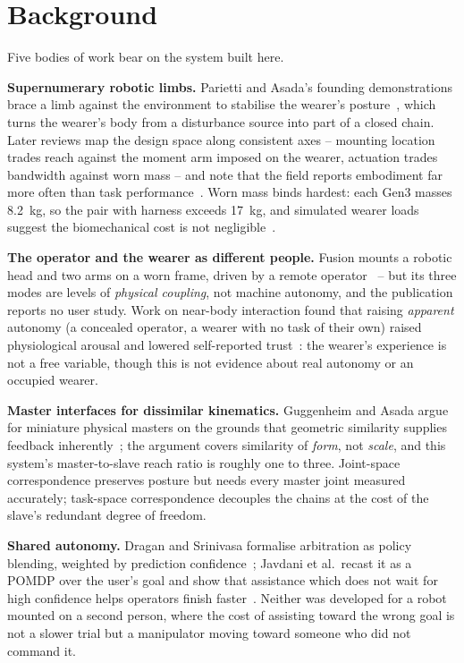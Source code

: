 \chapter{Background}
\label{ch:background}

Five bodies of work bear on the system built here.

\textbf{Supernumerary robotic limbs.} Parietti and Asada's founding
demonstrations brace a limb against the environment to stabilise the
wearer's posture~\cite{parietti2014bracing,parietti2013dynamic}, which turns
the wearer's body from a disturbance source into part of a closed chain.
Later reviews map the design space along consistent axes -- mounting
location trades reach against the moment arm imposed on the wearer,
actuation trades bandwidth against worn mass -- and note that the field
reports embodiment far more often than task
performance~\cite{yang2021srlreview,prattichizzo2021augmentation,zheng2026quantitative}.
Worn mass binds hardest: each Gen3 masses \SI{8.2}{\kilo\gram}, so the pair
with harness exceeds \SI{17}{\kilo\gram}, and simulated wearer loads suggest
the biomechanical cost is not negligible~\cite{moon2024impact}.

\textbf{The operator and the wearer as different people.} Fusion mounts a
robotic head and two arms on a worn frame, driven by a remote
operator~\cite{saraiji2018fusion} -- but its three modes are levels of
\emph{physical coupling}, not machine autonomy, and the publication reports
no user study. Work on near-body interaction found that raising
\emph{apparent} autonomy (a concealed operator, a wearer with no task of
their own) raised physiological arousal and lowered self-reported
trust~\cite{zhou2026proxemics}: the wearer's experience is not a free
variable, though this is not evidence about real autonomy or an occupied
wearer.

\textbf{Master interfaces for dissimilar kinematics.} Guggenheim and Asada
argue for miniature physical masters on the grounds that geometric
similarity supplies feedback inherently~\cite{guggenheim2021haptic}; the
argument covers similarity of \emph{form}, not \emph{scale}, and this
system's master-to-slave reach ratio is roughly one to three. Joint-space
correspondence preserves posture but needs every master joint measured
accurately; task-space correspondence decouples the chains at the cost of
the slave's redundant degree of freedom.

\textbf{Shared autonomy.} Dragan and Srinivasa formalise arbitration as
policy blending, weighted by prediction confidence~\cite{dragan2013policyblending};
Javdani et al.\ recast it as a POMDP over the user's goal and show that
assistance which does not wait for high confidence helps operators finish
faster~\cite{javdani2015hindsight}. Neither was developed for a robot mounted
on a second person, where the cost of assisting toward the wrong goal is not
a slower trial but a manipulator moving toward someone who did not command
it.

